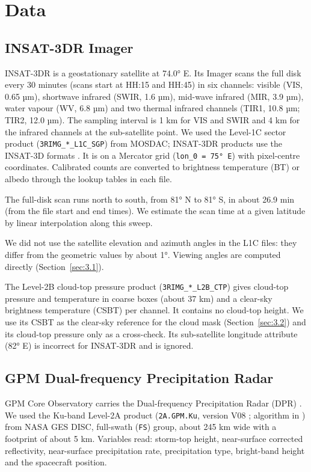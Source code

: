 \section{Data}
\label{sec:data}
\label{sec:2}

\subsection{INSAT-3DR Imager}\label{sec:2.1}

INSAT-3DR is a geostationary satellite at 74.0° E. Its Imager scans the full disk every 30 minutes (scans start at HH:15 and HH:45) in six channels: visible (VIS, 0.65 µm), shortwave infrared (SWIR, 1.6 µm), mid-wave infrared (MIR, 3.9 µm), water vapour (WV, 6.8 µm) and two thermal infrared channels (TIR1, 10.8 µm; TIR2, 12.0 µm). The sampling interval is 1 km for VIS and SWIR and 4 km for the infrared channels at the sub-satellite point. We used the Level-1C sector product (\texttt{3RIMG\_*\_L1C\_SGP}) from MOSDAC; INSAT-3DR products use the INSAT-3D formats \citep{sac2014}. It is on a Mercator grid (\texttt{lon\_0\ =\ 75°\ E}) with pixel-centre coordinates. Calibrated counts are converted to brightness temperature (BT) or albedo through the lookup tables in each file.

The full-disk scan runs north to south, from 81° N to 81° S, in about 26.9 min (from the file start and end times). We estimate the scan time at a given latitude by linear interpolation along this sweep.

We did not use the satellite elevation and azimuth angles in the L1C files: they differ from the geometric values by about 1°. Viewing angles are computed directly (Section~\ref{sec:3.1}).

The Level-2B cloud-top pressure product (\texttt{3RIMG\_*\_L2B\_CTP}) gives cloud-top pressure and temperature in coarse boxes (about 37 km) and a clear-sky brightness temperature (CSBT) per channel. It contains no cloud-top height. We use its CSBT as the clear-sky reference for the cloud mask (Section~\ref{sec:3.2}) and its cloud-top pressure only as a cross-check. Its sub-satellite longitude attribute (82° E) is incorrect for INSAT-3DR and is ignored.

\subsection{GPM Dual-frequency Precipitation Radar}\label{sec:2.2}

GPM Core Observatory carries the Dual-frequency Precipitation Radar (DPR) \citep{hou2014}. We used the Ku-band Level-2A product (\texttt{2A.GPM.Ku}, version V08 \citep{gpm2aku_v08}; algorithm in \citet{iguchi2021}) from NASA GES DISC, full-swath (\texttt{FS}) group, about 245 km wide with a footprint of about 5 km. Variables read: storm-top height, near-surface corrected reflectivity, near-surface precipitation rate, precipitation type, bright-band height and the spacecraft position.

